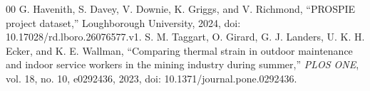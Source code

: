 \documentclass[conference,a4paper]{IEEEtran}
\begin{document}
\begin{thebibliography}{00}
 G. Havenith, S. Davey, V. Downie, K. Griggs, and V. Richmond, \textquotedblleft PROSPIE project dataset,\textquotedblright{} Loughborough University, 2024, doi: 10.17028/rd.lboro.26076577.v1.
 S. M. Taggart, O. Girard, G. J. Landers, U. K. H. Ecker, and K. E. Wallman, \textquotedblleft Comparing thermal strain in outdoor maintenance and indoor service workers in the mining industry during summer,\textquotedblright{} \emph{PLOS ONE}, vol. 18, no. 10, e0292436, 2023, doi: 10.1371/journal.pone.0292436.
\end{thebibliography}
\end{document}
